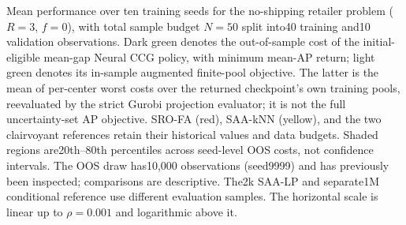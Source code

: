 Mean performance over ten training seeds for the no-shipping retailer problem
($R=3$, $f=0$), with total sample budget $N=50$ split into40 training and10
validation observations. Dark green denotes the out-of-sample cost of the
initial-eligible mean-gap Neural CCG policy, with minimum mean-AP return;
light green denotes its in-sample augmented finite-pool objective. The latter
is the mean of per-center worst costs over the returned checkpoint's own
training pools, reevaluated by the strict Gurobi projection evaluator; it is
not the full uncertainty-set AP objective. SRO-FA (red), SAA-kNN (yellow),
and the two clairvoyant references retain their historical values and data
budgets. Shaded regions are20th--80th percentiles across seed-level OOS costs,
not confidence intervals. The OOS draw has10,000 observations (seed9999) and
has previously been inspected; comparisons are descriptive. The2k SAA-LP
and separate1M conditional reference use different evaluation samples.
The horizontal scale is linear up to $\rho=0.001$ and logarithmic above it.